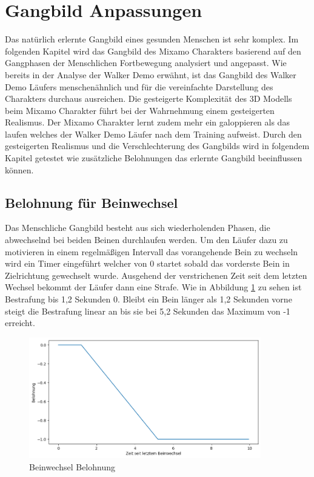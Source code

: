 \section{Gangbild Anpassungen}
Das natürlich erlernte Gangbild eines gesunden Menschen ist sehr komplex. Im folgenden Kapitel wird das Gangbild des Mixamo Charakters basierend auf den Gangphasen der Menschlichen Fortbewegung analysiert und angepasst. Wie bereits in der Analyse der Walker Demo erwähnt, ist das Gangbild des Walker Demo Läufers menschenähnlich und für die vereinfachte Darstellung des Charakters durchaus ausreichen. Die gesteigerte Komplexität des 3D Modells beim Mixamo Charakter führt bei der Wahrnehmung einem gesteigerten Realismus. Der Mixamo Charakter lernt zudem mehr ein galoppieren als das laufen welches der Walker Demo Läufer nach dem Training aufweist. Durch den gesteigerten Realismus und die Verschlechterung des Gangbilds wird in folgendem Kapitel getestet wie zusätzliche Belohnungen das erlernte Gangbild beeinflussen können.

\subsection{Belohnung für Beinwechsel}
Das Menschliche Gangbild besteht aus sich wiederholenden Phasen, die abwechselnd bei beiden Beinen durchlaufen werden. Um den Läufer dazu zu motivieren in einem regelmäßigen Intervall das vorangehende Bein zu wechseln wird ein Timer eingeführt welcher von 0 startet sobald das vorderste Bein in Zielrichtung gewechselt wurde. Ausgehend der verstrichenen Zeit seit dem letzten Wechsel bekommt der Läufer dann eine Strafe. Wie in Abbildung \ref{fig:plot_beinwechsel} zu sehen ist Bestrafung bis 1,2 Sekunden 0. Bleibt ein Bein länger als 1,2 Sekunden vorne steigt die Bestrafung linear an bis sie bei 5,2 Sekunden das Maximum von -1 erreicht.\cite{aiwarehouse}

\begin{figure}[H]
  \centering
  \includegraphics[width=0.9\textwidth]{img/plot_beinwechsel} 
  \caption{Beinwechsel Belohnung}
  \label{fig:plot_beinwechsel}
\end{figure}

